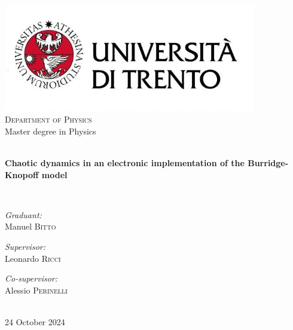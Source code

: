 \begin{titlepage}
    \begin{center}
    
    \includegraphics[width=11cm]{images/Logo Unitn.jpg}\\[1cm]
    
    \textsc{\Large Department of Physics}\\[1.5cm]
    
    {\Large Master degree in Physics}\\[1.5cm]
    
    \hrulefill\\[0.4cm]
    {\huge \bfseries Chaotic dynamics in an electronic implementation of the Burridge-Knopoff model\par}\vspace{0.4cm}
    \hrulefill\\[1.5cm]
    
    \begin{minipage}[t]{0.4\textwidth}
    \begin{flushleft} \large
    \emph{Graduant:}\\
    {Manuel \textsc{Bitto}}
    \end{flushleft}
    \end{minipage}
    \begin{minipage}[t]{0.4\textwidth}
    \begin{flushright} \large
    \emph{Supervisor:} \\
    {Leonardo \textsc{Ricci}}
    \end{flushright}
    \begin{flushright}
    \emph{Co-supervisor:}\\
    {Alessio \textsc{Perinelli}}
    \end{flushright}
    \end{minipage}\\[3cm]
    
    \vfill
    {\Large 24 October 2024}
    
    \end{center}
    \end{titlepage}